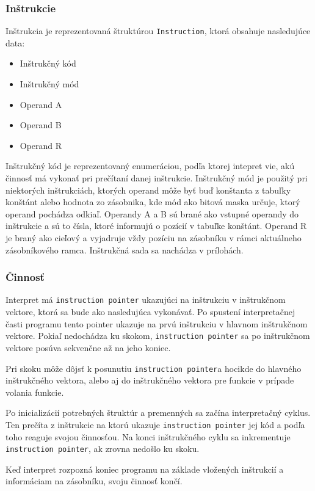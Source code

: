 \documentclass[12pt,a4paper,titlepage,final]{article}
\begin{document}
\subsubsection{Inštrukcie}
Inštrukcia je reprezentovaná štruktúrou \texttt{Instruction}, ktorá obsahuje nasledujúce data:
\begin{itemize}
    \itemsep0em
    \item Inštrukčný kód
    \item Inštrukčný mód
    \item Operand A
    \item Operand B
    \item Operand R
\end{itemize}
Inštrukčný kód je reprezentovaný enumeráciou, podľa ktorej intepret vie, akú činnosť má vykonať pri
prečítaní danej inštrukcie. Inštrukčný mód je použitý pri niektorých inštrukciách, ktorých operand
môže byť buď konštanta z tabuľky konštánt alebo hodnota zo zásobnika, kde mód ako bitová maska
určuje, ktorý operand pochádza odkiaľ. Operandy A a B sú brané ako vstupné operandy do inštrukcie a sú
to čísla, ktoré informujú o pozícií v tabuľke konštánt. Operand R je braný ako cieľový a vyjadruje vždy
pozíciu na zásobníku v rámci aktuálneho zásobníkového ramca. Inštrukčná sada sa nachádza v prílohách.

\subsubsection{Činnosť}
Interpret má \texttt{instruction pointer} ukazujúci na inštrukciu v inštrukčnom vektore,
ktorá sa bude ako nasledujúca vykonávať. Po spustení interpretačnej časti programu
tento pointer ukazuje na prvú inštrukciu v hlavnom inštrukčnom vektore. Pokiaľ nedochádza ku skokom,
\texttt{instruction pointer} sa po inštrukčnom vektore posúva sekvenčne až na jeho koniec.

Pri skoku môže dôjsť k posunutiu \texttt{instruction pointer}a hocikde do hlavného
inštrukčného vektora, alebo aj do inštrukčného vektora pre funkcie v prípade volania funkcie.

Po inicializácií potrebných štruktúr a premenných sa začína interpretačný cyklus.
Ten prečíta z inštrukcie na ktorú ukazuje \texttt{instruction pointer} jej kód a podľa
toho reaguje svojou činnosťou. Na konci inštrukčného cyklu sa inkrementuje \texttt{instruction pointer},
ak zrovna nedošlo ku skoku.

Keď interpret rozpozná koniec programu na základe vložených inštrukcií a informáciam na zásobníku, svoju činnosť končí.
\end{document}
